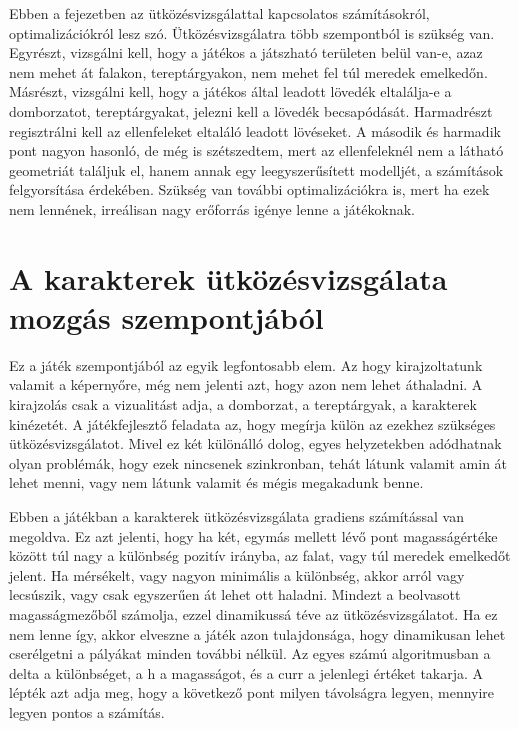 \label{Chap:utkozesvizsgalat}

Ebben a fejezetben az ütközésvizsgálattal kapcsolatos számításokról, optimalizációkról lesz szó. Ütközésvizsgálatra több szempontból is szükség van. Egyrészt, vizsgálni kell, hogy a játékos a játszható területen belül van-e, azaz nem mehet át falakon, tereptárgyakon, nem mehet fel túl meredek emelkedőn. Másrészt, vizsgálni kell, hogy a játékos által leadott lövedék eltalálja-e a domborzatot, tereptárgyakat, jelezni kell a lövedék becsapódását. Harmadrészt regisztrálni kell az ellenfeleket eltaláló leadott lövéseket. A második és harmadik pont nagyon hasonló, de még is szétszedtem, mert az ellenfeleknél nem a látható geometriát találjuk el, hanem annak egy leegyszerűsített modelljét, a számítások felgyorsítása érdekében. Szükség van további optimalizációkra is, mert ha ezek nem lennének, irreálisan nagy erőforrás igénye lenne a játékoknak.

\section{A karakterek ütközésvizsgálata mozgás szempontjából}

Ez a játék szempontjából az egyik legfontosabb elem. Az hogy kirajzoltatunk valamit a képernyőre, még nem jelenti azt, hogy azon nem lehet áthaladni. A kirajzolás csak a vizualitást adja, a domborzat, a tereptárgyak, a karakterek kinézetét. A játékfejlesztő feladata az, hogy megírja külön az ezekhez szükséges ütközésvizsgálatot. Mivel ez két különálló dolog, egyes helyzetekben adódhatnak olyan problémák, hogy ezek nincsenek szinkronban, tehát látunk valamit amin át lehet menni, vagy nem látunk valamit és mégis megakadunk benne.

Ebben a játékban a karakterek ütközésvizsgálata gradiens számítással van megoldva. Ez azt jelenti, hogy ha két, egymás mellett lévő pont magasságértéke között túl nagy a különbség pozitív irányba, az falat, vagy túl meredek emelkedőt jelent. Ha mérsékelt, vagy nagyon minimális a különbség, akkor arról vagy lecsúszik, vagy csak egyszerűen át lehet ott haladni. Mindezt a beolvasott magasságmezőből számolja, ezzel dinamikussá téve az ütközésvizsgálatot. Ha ez nem lenne így, akkor elveszne a játék azon tulajdonsága, hogy dinamikusan lehet cserélgetni a pályákat minden további nélkül. Az egyes számú algoritmusban a delta a különbséget, a h a magasságot, és a curr a jelenlegi értéket takarja. A lépték azt adja meg, hogy a következő pont milyen távolságra legyen, mennyire legyen pontos a számítás.

